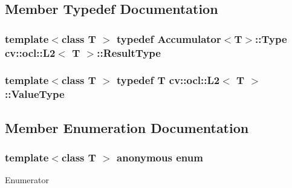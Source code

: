 \subsection{Member Typedef Documentation}
\hypertarget{structcv_1_1ocl_1_1L2_a637a30d36a2d2c9b1a71e6a13d4e0709}{
\subsubsection[{Result\-Type}]{\setlength{\rightskip}{0pt plus 5cm}template$<$class T $>$ typedef {\bf Accumulator}$<${\bf T}$>$\-::Type {\bf cv\-::ocl\-::\-L2}$<$ {\bf T} $>$\-::{\bf Result\-Type}}}\label{structcv_1_1ocl_1_1L2_a637a30d36a2d2c9b1a71e6a13d4e0709}
\hypertarget{structcv_1_1ocl_1_1L2_a1ddbd975d6a27d06b4c3bda8466435fe}{
\subsubsection[{Value\-Type}]{\setlength{\rightskip}{0pt plus 5cm}template$<$class T $>$ typedef {\bf T} {\bf cv\-::ocl\-::\-L2}$<$ {\bf T} $>$\-::{\bf Value\-Type}}}\label{structcv_1_1ocl_1_1L2_a1ddbd975d6a27d06b4c3bda8466435fe}


\subsection{Member Enumeration Documentation}
\hypertarget{structcv_1_1ocl_1_1L2_abd0f5659dd245f95a21d0f625e65058b}{\subsubsection[{anonymous enum}]{\setlength{\rightskip}{0pt plus 5cm}template$<$class T $>$ anonymous enum}}\label{structcv_1_1ocl_1_1L2_abd0f5659dd245f95a21d0f625e65058b}
\begin{Desc}
\item[Enumerator]\par
\begin{description}
\item[{\em 
\hypertarget{structcv_1_1ocl_1_1L2_abd0f5659dd245f95a21d0f625e65058ba7b703dc3fd348b6c3447078fa6fde351}{norm\-Type}\label{structcv_1_1ocl_1_1L2_abd0f5659dd245f95a21d0f625e65058ba7b703dc3fd348b6c3447078fa6fde351}
}]\end{description}
\end{Desc}


